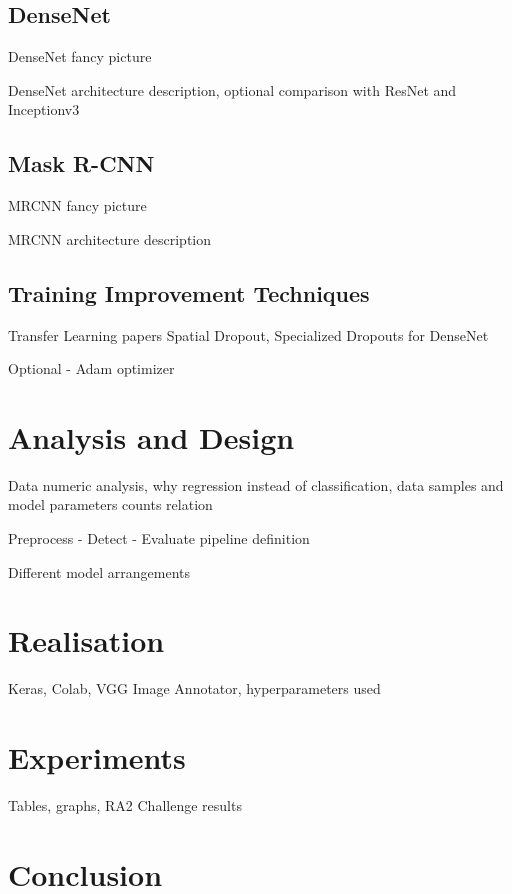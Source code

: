 \documentclass[thesis=B,english]{FITthesis}[2019/12/23]
\begin{document}
\section{DenseNet}

DenseNet fancy picture

DenseNet architecture description, optional comparison with ResNet and Inceptionv3

\section{Mask R-CNN}

MRCNN fancy picture

MRCNN architecture description

\section{Training Improvement Techniques}

Transfer Learning papers
Spatial Dropout, Specialized Dropouts for DenseNet

Optional - Adam optimizer

\chapter{Analysis and Design}

Data numeric analysis, why regression instead of classification, data samples and model parameters counts relation

Preprocess - Detect - Evaluate pipeline definition

Different model arrangements

\chapter{Realisation}

Keras, Colab, VGG Image Annotator, hyperparameters used

\chapter{Experiments}

Tables, graphs, RA2 Challenge results

\chapter{Conclusion}
\end{document}
